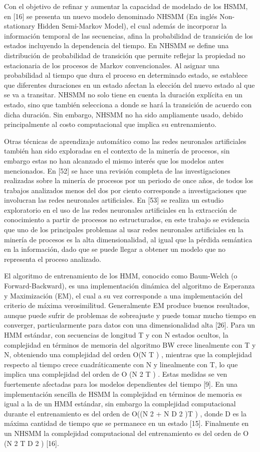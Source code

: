 Con el objetivo de refinar y aumentar la capacidad de modelado de los HSMM, en [16] se presenta un nuevo modelo denominado NHSMM (En inglés Non-stationary Hidden Semi-Markov Model), el cual además de incorporar la información temporal de las secuencias, afina la probabilidad de transición de los estados incluyendo la dependencia del tiempo. En NHSMM se define una distribución de probabilidad de transición que permite reflejar la propiedad no estacionaria de los procesos de Markov convencionales. Al asignar una probabilidad al tiempo que dura el proceso en determinado estado, se establece que diferentes duraciones en un estado afectan la elección del nuevo estado al que se va a transitar. NHSMM no solo tiene en cuenta la duración explícita en un estado, sino que también selecciona a donde se hará la transición de acuerdo con dicha duración. Sin embargo, NHSMM no ha sido ampliamente usado, debido principalmente al costo computacional que implica su entrenamiento.

Otras técnicas de aprendizaje automático como las redes neuronales artificiales también han sido exploradas en el contexto de la minería de procesos, sin embargo estas no han alcanzado el mismo interés que los modelos antes mencionados. En [52] se hace una revisión completa de las investigaciones realizadas sobre la minería de procesos por un periodo de once años, de todos los trabajos analizados menos del dos por ciento corresponde a investigaciones que involucran las redes neuronales artificiales. En [53] se realiza un estudio exploratorio en el uso de las redes neuronales artificiales en la extracción de conocimiento a partir de procesos no estructurados, en este trabajo se evidencia que uno de los principales problemas al usar redes neuronales artificiales en la minería de procesos es la alta dimensionalidad, al igual que la pérdida semántica en la información, dado que se puede llegar a obtener un modelo que no representa el proceso analizado.

El algoritmo de entrenamiento de los HMM, conocido como Baum-Welch (o Forward-Backward), es una implementación dinámica del algoritmo de Esperanza y Maximización (EM), el cual a su vez corresponde a una implementación del criterio de máxima verosimilitud. Generalmente EM produce buenos resultados, aunque puede sufrir de problemas de sobreajuste y puede tomar mucho tiempo en converger, particularmente para datos con una dimensionalidad alta [26]. Para un HMM estándar, con secuencias de longitud T y con N estados ocultos, la complejidad en términos de memoria del algoritmo BW crece linealmente con T y N, obteniendo una complejidad del orden O(N T ) , mientras que la complejidad respecto al tiempo crece cuadráticamente con N y linealmente con T, lo que implica una complejidad del orden de O (N 2 T ) . Estas medidas se ven fuertemente afectadas para los modelos dependientes del tiempo [9]. En una implementación sencilla de HSMM la complejidad en términos de memoria es igual a la de un HMM estándar, sin embargo la complejidad computacional durante el entrenamiento es del orden de O((N 2 + N D 2 )T ) , donde D es la máxima cantidad de tiempo que se permanece en un estado [15]. Finalmente en un NHSMM la complejidad computacional del entrenamiento es del orden de O (N 2 T D 2 ) [16].

